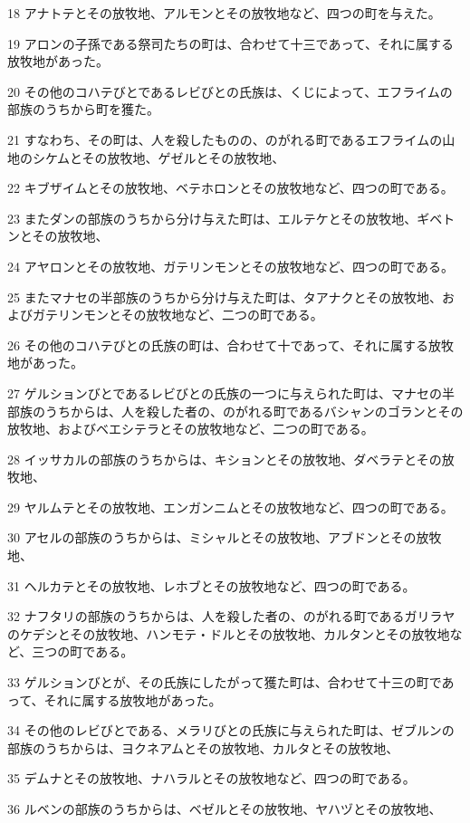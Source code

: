 \par 18 アナトテとその放牧地、アルモンとその放牧地など、四つの町を与えた。
\par 19 アロンの子孫である祭司たちの町は、合わせて十三であって、それに属する放牧地があった。
\par 20 その他のコハテびとであるレビびとの氏族は、くじによって、エフライムの部族のうちから町を獲た。
\par 21 すなわち、その町は、人を殺したものの、のがれる町であるエフライムの山地のシケムとその放牧地、ゲゼルとその放牧地、
\par 22 キブザイムとその放牧地、ベテホロンとその放牧地など、四つの町である。
\par 23 またダンの部族のうちから分け与えた町は、エルテケとその放牧地、ギベトンとその放牧地、
\par 24 アヤロンとその放牧地、ガテリンモンとその放牧地など、四つの町である。
\par 25 またマナセの半部族のうちから分け与えた町は、タアナクとその放牧地、およびガテリンモンとその放牧地など、二つの町である。
\par 26 その他のコハテびとの氏族の町は、合わせて十であって、それに属する放牧地があった。
\par 27 ゲルションびとであるレビびとの氏族の一つに与えられた町は、マナセの半部族のうちからは、人を殺した者の、のがれる町であるバシャンのゴランとその放牧地、およびベエシテラとその放牧地など、二つの町である。
\par 28 イッサカルの部族のうちからは、キションとその放牧地、ダベラテとその放牧地、
\par 29 ヤルムテとその放牧地、エンガンニムとその放牧地など、四つの町である。
\par 30 アセルの部族のうちからは、ミシャルとその放牧地、アブドンとその放牧地、
\par 31 ヘルカテとその放牧地、レホブとその放牧地など、四つの町である。
\par 32 ナフタリの部族のうちからは、人を殺した者の、のがれる町であるガリラヤのケデシとその放牧地、ハンモテ・ドルとその放牧地、カルタンとその放牧地など、三つの町である。
\par 33 ゲルションびとが、その氏族にしたがって獲た町は、合わせて十三の町であって、それに属する放牧地があった。
\par 34 その他のレビびとである、メラリびとの氏族に与えられた町は、ゼブルンの部族のうちからは、ヨクネアムとその放牧地、カルタとその放牧地、
\par 35 デムナとその放牧地、ナハラルとその放牧地など、四つの町である。
\par 36 ルベンの部族のうちからは、ベゼルとその放牧地、ヤハヅとその放牧地、
